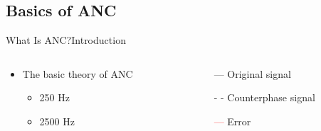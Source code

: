 \subsection{Basics of ANC}
\begin{frame}{What Is ANC?}{Introduction}		
	\begin{columns}
		\begin{column}{0.5\textwidth}
				\begin{itemize}
					\item The basic theory of ANC
					\begin{itemize}
						\item  250 Hz
						\item 2500 Hz 
					\end{itemize}	
				\end{itemize}
			\vspace{-2.5mm}	
		\begin{center}
	 		
	 	\end{center}
		\end{column}
		\begin{column}{0.5\textwidth} 
			\begin{itemize}
				\item[\textcolor{MATLABblue}{---}] Original signal
				\item[\textcolor{MATLABblue}{- -}] Counterphase signal
				\item[\textcolor{red}{---}] Error
			\end{itemize}
		\begin{center}
	 		
	 	\end{center}
		\end{column}
	\end{columns}
\end{frame}

